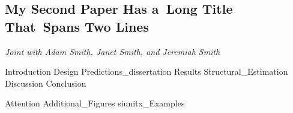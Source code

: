 \documentclass[11pt, a4paper, twoside]{book}
\begin{document}


\renewcommand{\currentchapter}{Ch2}

\begin{refsection}

\makeatletter
\renewcommand{\@makefntext}[1]{\@makefntextorig{#1}}
\makeatother
\chapter
	[My Second Paper Has a~Long Title That\nolinebreak\  Spans Two Lines]
	{My Second Paper Has a\nolinebreak\ Long Title That\nolinebreak\  Spans Two Lines%
	 \setcounter{footnote}{1}\textsuperscript{\Large{}}%
	}
\label{diss:MySecondPaper}
\renewcommand{\thefootnote}{\fnsymbol{footnote}}
\footnotetext[1]{\:\protect}
\renewcommand{\thefootnote}{\thefootnoteorig}
\makeatletter
\renewcommand{\@makefntext}[1]{\@makefntextcustom{#1}}
\renewcommand{\@makefnmark}{\@makefnmarkorig}
\makeatother
\setcounter{footnote}{0}
\vspace{-\bigskipamount}\textsf{\textit{Joint with Adam Smith, Janet Smith, and Jeremiah Smith}} \bigskip

\graphicspath{{1_Example_Content/}}
{Introduction}
{Design}
{Predictions_dissertation}
{Results}
{Structural_Estimation}
{Discussion}
{Conclusion}

\begin{subappendices}
	\label{sec:appendix}
	\FloatBarrier
	{Attention}
	\FloatBarrier
	\newpage
	{Additional_Figures}
	\FloatBarrier
	{siunitx_Examples}
	\clearpage
\end{subappendices}

\begin{refcontext}[sorting=nyt]
	\printbibliography[heading=subbibliography]
\end{refcontext}

\end{refsection}
\end{document}
